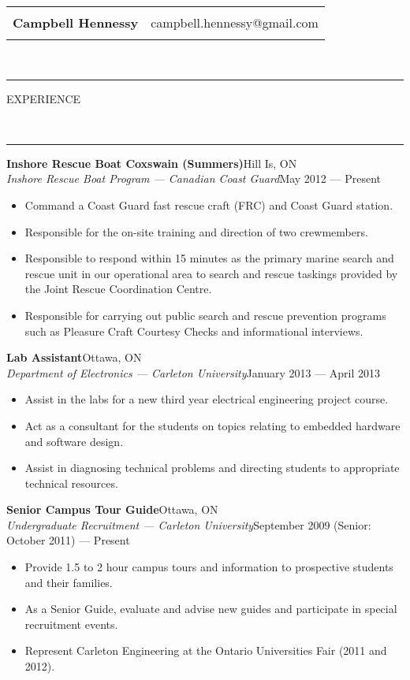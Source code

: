 \documentclass[10pt, letterpaper, oneside]{article}
\makeatletter
\newcommand{\name}{Campbell Hennessy}
\newcommand{\email}{campbell.hennessy@gmail.com}
\newcommand{\HRule}[2]{\textcolor{#1}{\rule{\linewidth}{#2}}}
\newcommand{\sectiontitle}[1]{\begin{minipage}{\textwidth}\HRule{black}{0.25mm}\vspace{-10pt}\begin{center}\Large\MakeUppercase{#1}\end{center}\end{minipage}\\\HRule{light-grey}{0.15mm}\vspace{\baselineskip}}
\newenvironment{ressection}[1]{
  \sectiontitle{#1}}
  {\vspace{-\baselineskip}}
\newcommand{\resitem}[1]{
    \vspace{2pt}
    \item \begin{flushleft} #1 \end{flushleft}
}
\newcommand{\resentryheader}[4]{
    \vspace{-5pt}
    \textbf{#1}\hspace{\stretch{1}}\textcolor{light-grey}{#3}\\
    \textit{#2}\hspace{\stretch{1}}\textcolor{light-grey}{#4}\\
}
\newenvironment{resentry}[4]{
  \begin{minipage}{\textwidth}
    \resentryheader{#1}{#2}{#3}{#4}
        \vspace{-\baselineskip}
    \begin{itemize}[noitemsep,nolistsep]
}{
    \end{itemize}
        \vspace{\baselineskip}
        \end{minipage}
}
\makeatother
\begin{document}
 
\begin{tabularx}{\linewidth}{X r}
\multirow{3}{*}{\Huge\textbf{\name}} & \\& \email\\\\
\end{tabularx}\\
 
\begin{ressection}{experience}
  \begin{resentry}{Inshore Rescue Boat Coxswain (Summers)}{Inshore Rescue Boat Program --- Canadian Coast Guard}{Hill Is, ON}{May 2012 --- Present}
    \resitem{Command a Coast Guard fast rescue craft (FRC) and Coast Guard station.}
    \resitem{Responsible for the on-site training and direction of two crewmembers.}
    \resitem{Responsible to respond within 15 minutes as the primary marine search and rescue unit in our operational area to search and rescue taskings provided by the Joint Rescue Coordination Centre.}
    \resitem{Responsible for carrying out public search and rescue prevention programs such as Pleasure Craft Courtesy Checks and informational interviews.}
  \end{resentry}
 
  \begin{resentry}{Lab Assistant}{Department of Electronics --- Carleton University}{Ottawa, ON}{January 2013 --- April 2013}
    \resitem{Assist in the labs for a new third year electrical engineering project course.}
    \resitem{Act as a consultant for the students on topics relating to embedded hardware and software design.}
    \resitem{Assist in diagnosing technical problems and directing students to appropriate technical resources.}
  \end{resentry}
 
  \begin{resentry}{Senior Campus Tour Guide}{Undergraduate Recruitment --- Carleton University}{Ottawa, ON}{September 2009 (Senior: October 2011) --- Present}
    \resitem{Provide 1.5 to 2 hour campus tours and information to prospective students and their families.}
    \resitem{As a Senior Guide, evaluate and advise new guides and participate in special recruitment events.}
    \resitem{Represent Carleton Engineering at the Ontario Universities Fair (2011 and 2012).}
  \end{resentry}
 

\end{ressection}
\end{document}
